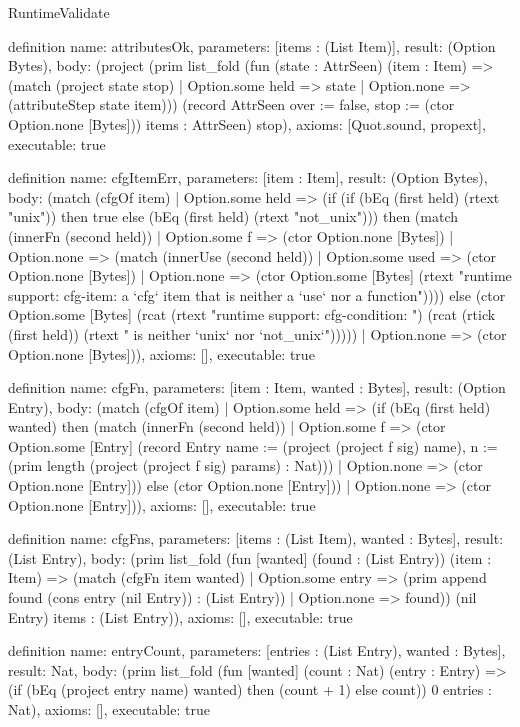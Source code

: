 \begin{lexlean}{RuntimeValidate}
\begin{semanticmodule}
definition{
  name: attributesOk,
  parameters: [items : (List Item)],
  result: (Option Bytes),
  body: (project (prim list_fold (fun (state : AttrSeen) (item : Item) => (match (project state stop)
    | Option.some held => state
    | Option.none => (attributeStep state item))) (record AttrSeen {over := false, stop := (ctor Option.none [Bytes])}) items : AttrSeen) stop),
  axioms: [Quot.sound, propext],
  executable: true
}

definition{
  name: cfgItemErr,
  parameters: [item : Item],
  result: (Option Bytes),
  body: (match (cfgOf item)
    | Option.some held => (if (if (bEq (first held) (rtext "unix")) then true else (bEq (first held) (rtext "not_unix"))) then (match (innerFn (second held))
      | Option.some f => (ctor Option.none [Bytes])
      | Option.none => (match (innerUse (second held))
        | Option.some used => (ctor Option.none [Bytes])
        | Option.none => (ctor Option.some [Bytes] (rtext "runtime support: cfg-item: a `cfg` item that is neither a `use` nor a function")))) else (ctor Option.some [Bytes] (rcat (rtext "runtime support: cfg-condition: ") (rcat (rtick (first held)) (rtext " is neither `unix` nor `not_unix`")))))
    | Option.none => (ctor Option.none [Bytes])),
  axioms: [],
  executable: true
}

definition{
  name: cfgFn,
  parameters: [item : Item, wanted : Bytes],
  result: (Option Entry),
  body: (match (cfgOf item)
    | Option.some held => (if (bEq (first held) wanted) then (match (innerFn (second held))
      | Option.some f => (ctor Option.some [Entry] (record Entry {name := (project (project f sig) name), n := (prim length (project (project f sig) params) : Nat)}))
      | Option.none => (ctor Option.none [Entry])) else (ctor Option.none [Entry]))
    | Option.none => (ctor Option.none [Entry])),
  axioms: [],
  executable: true
}

definition{
  name: cfgFns,
  parameters: [items : (List Item), wanted : Bytes],
  result: (List Entry),
  body: (prim list_fold (fun [wanted] (found : (List Entry)) (item : Item) => (match (cfgFn item wanted)
    | Option.some entry => (prim append found (cons entry (nil Entry)) : (List Entry))
    | Option.none => found)) (nil Entry) items : (List Entry)),
  axioms: [],
  executable: true
}

definition{
  name: entryCount,
  parameters: [entries : (List Entry), wanted : Bytes],
  result: Nat,
  body: (prim list_fold (fun [wanted] (count : Nat) (entry : Entry) => (if (bEq (project entry name) wanted) then (count + 1) else count)) 0 entries : Nat),
  axioms: [],
  executable: true
}


\end{semanticmodule}
\end{lexlean}

